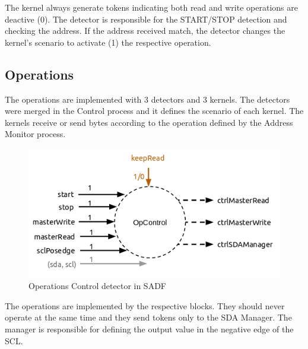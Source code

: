 \documentclass{article}
\begin{document}
The kernel always generate tokens indicating both read and write operations are deactive (0). The detector is responsible for the START/STOP detection and checking the address. If the address received match, the detector changes the kernel's scenario to activate (1) the respective operation.

\subsection{Operations}
The operations are implemented with 3 detectors and 3 kernels. The detectors were merged in the Control process and it defines the scenario of each kernel. The kernels receive or send bytes according to the operation defined by the Address Monitor process.
\begin{figure}
  \includegraphics[width=\linewidth]{img/block_control.png}
  \caption{Operations Control detector in SADF}
  \label{fig:block_control}
\end{figure}

The operations are implemented by the respective blocks. They should never operate at the same time and they send tokens only to the SDA Manager. The manager is responsible for defining the output value in the negative edge of the SCL.
\end{document}
